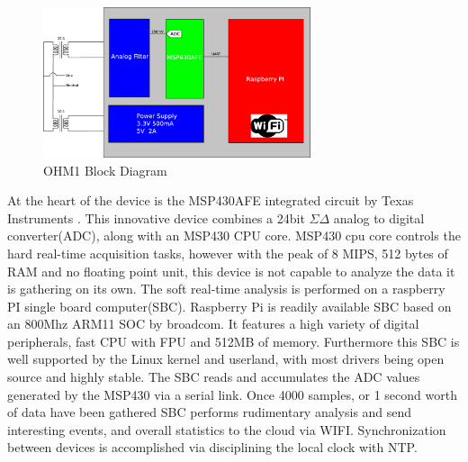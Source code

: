 \begin{figure}[h!]
\centering
\includegraphics[width=0.7\textwidth]{img/OHM1Block.eps}
\caption{OHM1 Block Diagram}
\end{figure}

	At the heart of the device is the MSP430AFE integrated circuit by Texas Instruments \textregistered. This innovative device combines a 24bit $\Sigma\Delta$ analog to digital converter(ADC),
along with an MSP430 CPU core. MSP430 cpu core controls the hard real-time acquisition tasks, however with the peak of 8 MIPS, 512 bytes of RAM and no floating point unit, this device is not
capable to analyze the data it is gathering on its own. The soft real-time analysis is performed on a raspberry PI single board computer(SBC). Raspberry Pi is readily available SBC based on an 800Mhz
ARM11 SOC by broadcom. It features a high variety of digital peripherals, fast CPU with FPU and 512MB of memory. Furthermore this SBC is well supported by the Linux kernel and userland, 
with most drivers being open source and highly stable. The SBC reads and accumulates the ADC values generated by the MSP430 via a serial link. Once 4000 samples, or 1 second worth of data
have been gathered SBC performs rudimentary analysis and send interesting events, and overall statistics to the cloud via WIFI. Synchronization between devices is accomplished via disciplining the 
local clock with NTP.

